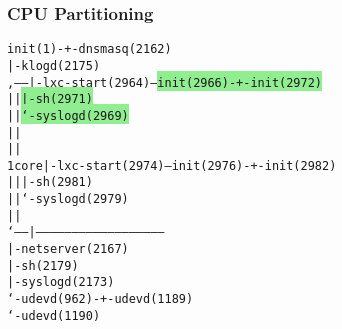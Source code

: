 \begin{frame}[fragile]
\frametitle{CPU Partitioning}
\begin{alltt}\footnotesize
init(1)-+-dnsmasq(2162)
        |-klogd(2175)       
  ,-----|-lxc-start(2964)---\colorbox{LightGreen}{init(2966)-+-init(2972)    }
  |     |                \colorbox{LightGreen}{              |-sh(2971)      }
  |     |                   \colorbox{LightGreen}{              `-syslogd(2969) }
  |     |                   
  |     |                   
1 core  |-lxc-start(2974)---\colorbox{LightRed}{init(2976)-+-init(2982)    }
  |     |                \colorbox{LightRed}{              |-sh(2981)      }
  |     |                   \colorbox{LightRed}{              `-syslogd(2979) }
  |     |                   
  `-----|-----------------------------------------------------
        |-netserver(2167)
        |-sh(2179)
        |-syslogd(2173)
        `-udevd(962)-+-udevd(1189)
                     `-udevd(1190)
\end{alltt}\normalsize
\end{frame}